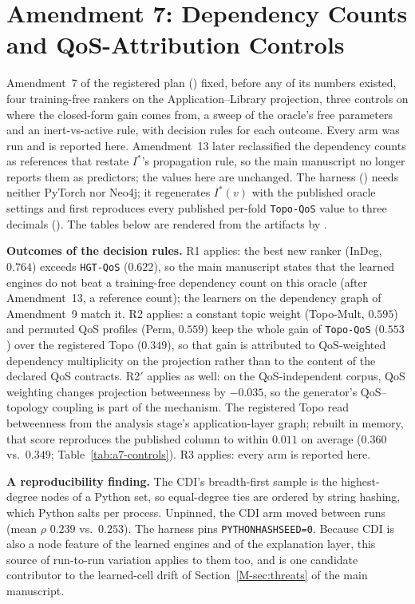 \documentclass[preprint,3p]{elsarticle}
\begin{document}
\section{Amendment 7: Dependency Counts and QoS-Attribution Controls}
\label{supp:amendment7}

Amendment~7 of the registered plan () fixed, before any of its numbers existed, four training-free rankers on the Application--Library projection, three controls on where the closed-form gain comes from, a sweep of the oracle's free parameters and an inert-vs-active rule, with decision rules for each outcome. Every arm was run and is reported here. Amendment~13 later reclassified the dependency counts as references that restate $I^*$'s propagation rule, so the main manuscript no longer reports them as predictors; the values here are unchanged. The harness () needs neither PyTorch nor Neo4j; it regenerates $I^*(v)$ with the published oracle settings and first reproduces every published per-fold \texttt{Topo-QoS} value to three decimals (). The tables below are rendered from the artifacts by .

\noindent\textbf{Outcomes of the decision rules.} R1 applies: the best new ranker (InDeg, $0.764$) exceeds \texttt{HGT-QoS} ($0.622$), so the main manuscript states that the learned engines do not beat a training-free dependency count on this oracle (after Amendment~13, a reference count); the learners on the dependency graph of Amendment~9 match it. R2 applies: a constant topic weight (Topo-Mult, $0.595$) and permuted QoS profiles (Perm, $0.559$) keep the whole gain of \texttt{Topo-QoS} ($0.553$) over the registered Topo ($0.349$), so that gain is attributed to QoS-weighted dependency multiplicity on the projection rather than to the content of the declared QoS contracts. R2$'$ applies as well: on the QoS-independent corpus, QoS weighting changes projection betweenness by $-0.035$, so the generator's QoS--topology coupling is part of the mechanism. The registered Topo read betweenness from the analysis stage's application-layer graph; rebuilt in memory, that score reproduces the published column to within $0.011$ on average ($0.360$ vs.\ $0.349$; Table~\ref{tab:a7-controls}). R3 applies: every arm is reported here.

\noindent\textbf{A reproducibility finding.} The CDI's breadth-first sample is the highest-degree nodes of a Python set, so equal-degree ties are ordered by string hashing, which Python salts per process. Unpinned, the CDI arm moved between runs (mean $\rho$ $0.239$ vs.\ $0.253$). The harness pins \texttt{PYTHONHASHSEED=0}. Because CDI is also a node feature of the learned engines and of the explanation layer, this source of run-to-run variation applies to them too, and is one candidate contributor to the learned-cell drift of Section~\ref{M-sec:threats} of the main manuscript.
\end{document}
